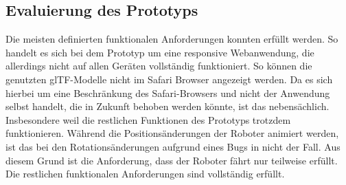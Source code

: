 \subsection{Evaluierung des Prototyps}
Die meisten definierten funktionalen Anforderungen konnten erfüllt werden. So handelt es sich bei dem Prototyp um eine responsive Webanwendung, die allerdings nicht auf allen Geräten vollständig funktioniert. So können die genutzten \ac{glTF}-Modelle nicht im Safari Browser angezeigt werden. Da es sich hierbei um eine Beschränkung des Safari-Browsers und nicht der Anwendung selbst handelt, die in Zukunft behoben werden könnte, ist das nebensächlich. Insbesondere weil die restlichen Funktionen des Prototyps trotzdem funktionieren. Während die Positionsänderungen der Roboter animiert werden, ist das bei den Rotationsänderungen aufgrund eines Bugs in \deckgl{} nicht der Fall. Aus diesem Grund ist die Anforderung, dass der Roboter fährt nur teilweise erfüllt. Die restlichen funktionalen Anforderungen sind vollständig erfüllt.




